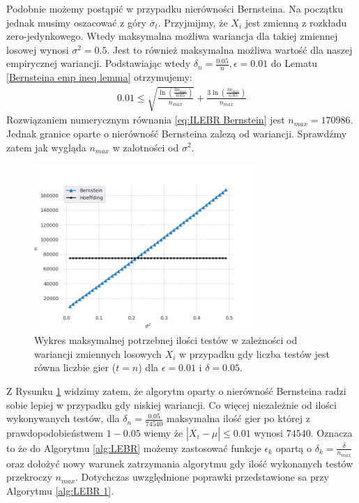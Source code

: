 \documentclass[inzynierska]{pwr_wmat_praca_dyplomowa}
\theoremstyle{plain}
\numberwithin{theorem}{chapter}
\theoremstyle{definition}
\numberwithin{theorem}{chapter}
\begin{document}
	Podobnie możemy postąpić w przypadku nierówności Bernsteina.
	Na początku jednak musimy oszacować z góry $\overline{\sigma}_t$.
	Przyjmijmy, że $X_i$ jest zmienną z rozkładu zero-jedynkowego.
	Wtedy maksymalna możliwa wariancja dla takiej zmiennej losowej wynosi $\sigma^2 = 0.5$. Jest to również maksymalna możliwa wartość dla naszej empirycznej wariancji. Podstawiając wtedy $\delta_n = \frac{0.05}{n}, \epsilon = 0.01$ do Lematu \ref{Bernsteina emp ineq lemma} otrzymujemy:
	\begin{gather}
		\label{eq:ILEBR Bernstein}
		0.01 \le \sqrt{\frac{\ln(\frac{3n_{max}}{0.05})}{n_{max}}} + \frac{3  \ln(\frac{3n_{max}}{0.05})}{n_{max}} 
	\end{gather}
	Rozwiązaniem numerycznym równania \ref{eq:ILEBR Bernstein} jest $n_{max}=170986$. Jednak granice oparte o nierówność Bernsteina zalezą od wariancji. Sprawdźmy zatem jak wygląda $n_{max}$ w zalotności od $\sigma^2$.
	\begin{figure}[H]
		\centering
		\includegraphics[width=0.75\textwidth]{imagens/t_eq_n.png}
		\captionsetup{justification=centering}
		\caption{Wykres maksymalnej potrzebnej ilości testów w zależności od wariancji zmiennych losowych  $X_i$ w przypadku gdy liczba testów jest równa liczbie gier ($t = n$) dla $\epsilon=0.01$ i $\delta = 0.05$.}
		\label{fig:t_eq_n}
	\end{figure}
	Z Rysunku \ref{fig:t_eq_n} widzimy zatem, że algorytm oparty o nierówność Bernsteina radzi sobie lepiej w przypadku gdy niskiej wariancji. Co więcej niezależnie od ilości wykonywanych testów, dla $\delta_n = \frac{0.05}{74540}$ maksymalna ilość gier po której z prawdopodobieństwem $1-0.05$ wiemy że $|\overline{X_i} - \mu| \le 0.01$ wynosi $74540$. Oznacza to że do Algorytmu \ref{alg:LEBR} możemy zastosować funkcje $\epsilon_k$ opartą o $\delta_k = \frac{\delta}{n_{max}}$ oraz dołożyć nowy warunek zatrzymania algorytmu gdy ilość wykonanych testów przekroczy $n_{max}$. Dotychczas uwzględnione poprawki przedstawione sa przy Algorytmu \ref{alg:LEBR 1}.
\end{document}
